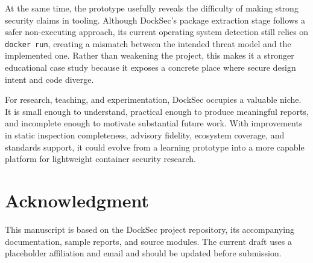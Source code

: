 \documentclass[12pt,draftclsnofoot,onecolumn]{IEEEtran}
\begin{document}
At the same time, the prototype usefully reveals the difficulty of making strong security claims in tooling. Although DockSec's package extraction stage follows a safer non-executing approach, its current operating system detection still relies on \texttt{docker run}, creating a mismatch between the intended threat model and the implemented one. Rather than weakening the project, this makes it a stronger educational case study because it exposes a concrete place where secure design intent and code diverge.

For research, teaching, and experimentation, DockSec occupies a valuable niche. It is small enough to understand, practical enough to produce meaningful reports, and incomplete enough to motivate substantial future work. With improvements in static inspection completeness, advisory fidelity, ecosystem coverage, and standards support, it could evolve from a learning prototype into a more capable platform for lightweight container security research.

\section*{Acknowledgment}
This manuscript is based on the DockSec project repository, its accompanying documentation, sample reports, and source modules. The current draft uses a placeholder affiliation and email and should be updated before submission.



\end{document}
